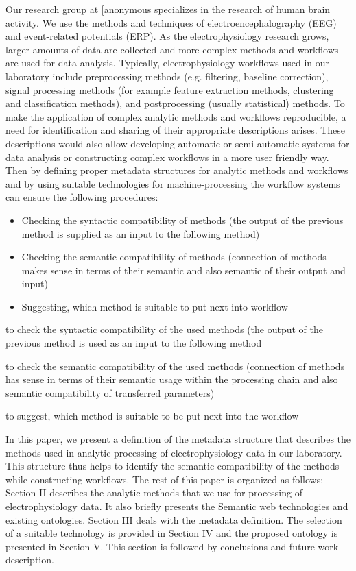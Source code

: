 \documentclass[a4paper,twoside]{article}
\begin{document}
\noindent Our research group at [anonymous%
specializes in the research of human brain activity. We use the methods and techniques of electroencephalography (EEG) and event-related potentials (ERP). As the electrophysiology research grows, larger amounts of data are collected and more complex methods and workflows are used for data analysis. Typically, electrophysiology workflows used in our laboratory include preprocessing methods (e.g. filtering, baseline correction), signal processing methods (for example feature extraction methods, clustering and classification methods), and postprocessing (usually statistical) methods. To make the application of complex analytic methods and workflows reproducible, a need for identification and sharing of their appropriate descriptions arises. These descriptions would also allow developing automatic or semi-automatic systems for data analysis or constructing complex workflows in a more user friendly way. Then by defining proper metadata structures for analytic methods and workflows and by using suitable technologies for machine-processing the workflow systems can ensure the following procedures:

\begin{itemize}
	\item Checking the syntactic compatibility of methods (the output of the previous method is supplied as an input to the following method)
	
	\item Checking the semantic compatibility of methods (connection of methods makes sense in terms of their semantic and also semantic of their output and input)
	
	\item Suggesting, which method is suitable to put next into workflow
	
\end{itemize}

\item to check the syntactic compatibility of the used methods (the output of the previous method is used as an input to the following method
\item to check the semantic compatibility of the used methods (connection of methods has sense in terms of their semantic usage within the processing chain and also semantic compatibility of transferred parameters)
\item to suggest, which method is suitable to be put next into the workflow

In this paper, we present a definition of the metadata structure that describes the methods used in analytic processing of electrophysiology data in our laboratory. This structure thus helps to identify the semantic compatibility of the methods while constructing workflows. The rest of this paper is organized as follows: Section II describes the analytic methods that we use for processing of electrophysiology data. It also briefly presents the Semantic web technologies and existing ontologies. Section III deals with the metadata definition. The selection of a suitable technology is provided in Section IV and the proposed ontology is presented in Section V. This section is followed by conclusions and future work description.
\end{document}
